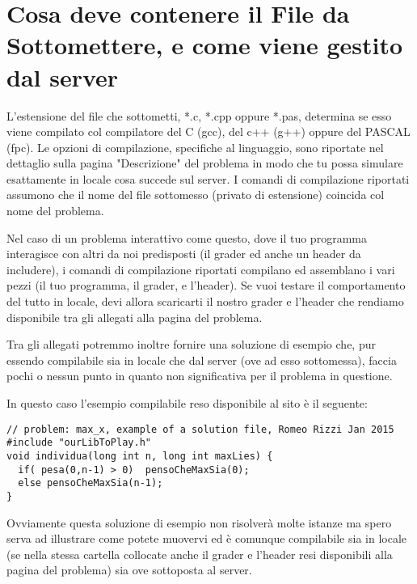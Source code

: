 \documentclass[a4paper,11pt]{article}
\begin{document}
  \section*{Cosa deve contenere il File da Sottomettere, e come viene gestito dal server}

  L'estensione del file che sottometti, *.c, *.cpp oppure *.pas,
  determina se esso viene compilato col compilatore del C (gcc),
  del c++ (g++) oppure del PASCAL (fpc).
  Le opzioni di compilazione, specifiche al linguaggio,
  sono riportate nel dettaglio sulla pagina "Descrizione" del problema
  in modo che tu possa simulare esattamente in locale cosa succede sul server.
  I comandi di compilazione riportati assumono che il nome del file sottomesso (privato di estensione) coincida col nome del problema.

  Nel caso di un problema interattivo come questo,
  dove il tuo programma interagisce con altri da noi predisposti
  (il grader ed anche un header da includere), i comandi di compilazione riportati compilano ed assemblano i vari pezzi (il tuo programma, il grader, e l'header).
  Se vuoi testare il comportamento del tutto in locale,
  devi allora scaricarti il nostro grader e l'header che rendiamo disponibile tra gli allegati alla pagina del problema.

  Tra gli allegati potremmo inoltre fornire una soluzione di esempio che,
  pur essendo compilabile sia in locale che dal server (ove ad esso sottomessa),
  faccia pochi o nessun punto in quanto non significativa per il problema
  in questione.

  In questo caso l'esempio compilabile reso disponibile al sito \`e il seguente:
\begin{verbatim}
// problem: max_x, example of a solution file, Romeo Rizzi Jan 2015
#include "ourLibToPlay.h"
void individua(long int n, long int maxLies) {
  if( pesa(0,n-1) > 0)  pensoCheMaxSia(0); 
  else pensoCheMaxSia(n-1); 
}
\end{verbatim}

Ovviamente questa soluzione di esempio non risolver\`a molte istanze
ma spero serva ad illustrare come potete muovervi ed \`e comunque compilabile sia in locale (se nella stessa cartella collocate anche il grader e l'header resi disponibili alla pagina del problema) sia ove sottoposta al server.
  
  
\end{document}
